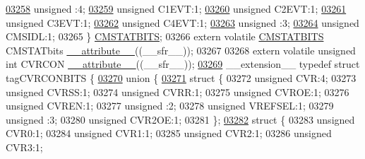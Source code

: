 \begin{DoxyCode}
\hypertarget{a00009_source_l03258}{}\hyperlink{a00008_adf71f3d8410c1f1dbbc96680a92c49af}{03258}   \textcolor{keywordtype}{unsigned} :4;
\hypertarget{a00009_source_l03259}{}\hyperlink{a00008_acb7ee136b83067f36d2dadab8625b1a7}{03259}   \textcolor{keywordtype}{unsigned} C1EVT:1;
\hypertarget{a00009_source_l03260}{}\hyperlink{a00008_aec68f11a447fc00b2a632bb8aae3899e}{03260}   \textcolor{keywordtype}{unsigned} C2EVT:1;
\hypertarget{a00009_source_l03261}{}\hyperlink{a00008_a12277a444d526f913bb692c4aff46c78}{03261}   \textcolor{keywordtype}{unsigned} C3EVT:1;
\hypertarget{a00009_source_l03262}{}\hyperlink{a00008_a8cb94c32ab97dbd81bac22bf1317e706}{03262}   \textcolor{keywordtype}{unsigned} C4EVT:1;
\hypertarget{a00009_source_l03263}{}\hyperlink{a00008_acaf2d0924a107ec6e8d2e31febaf66f9}{03263}   \textcolor{keywordtype}{unsigned} :3;
\hypertarget{a00009_source_l03264}{}\hyperlink{a00008_ade32d9beff74e352daa224124b7f49d2}{03264}   \textcolor{keywordtype}{unsigned} CMSIDL:1;
03265 \} \hyperlink{a00008_d0/d01/a00339}{CMSTATBITS};
03266 \textcolor{keyword}{extern} \textcolor{keyword}{volatile} \hyperlink{a00008_d0/d01/a00339}{CMSTATBITS} CMSTATbits \hyperlink{a00009_a493c46f03454991ccc5aa7a6e1dfb2a7}{\_\_attribute\_\_}((\_\_sfr\_\_));
03267 
03268 \textcolor{keyword}{extern} \textcolor{keyword}{volatile} \textcolor{keywordtype}{unsigned} \textcolor{keywordtype}{int}  CVRCON \hyperlink{a00009_a493c46f03454991ccc5aa7a6e1dfb2a7}{\_\_attribute\_\_}((\_\_sfr\_\_));
\hypertarget{a00009_source_l03269}{}\hyperlink{a00008}{03269} \_\_extension\_\_ \textcolor{keyword}{typedef} \textcolor{keyword}{struct }tagCVRCONBITS \{
\hypertarget{a00009_source_l03270}{}\hyperlink{a00009}{03270}   \textcolor{keyword}{union }\{
\hypertarget{a00009_source_l03271}{}\hyperlink{a00009}{03271}     \textcolor{keyword}{struct }\{
03272       \textcolor{keywordtype}{unsigned} CVR:4;
03273       \textcolor{keywordtype}{unsigned} CVRSS:1;
03274       \textcolor{keywordtype}{unsigned} CVRR:1;
03275       \textcolor{keywordtype}{unsigned} CVROE:1;
03276       \textcolor{keywordtype}{unsigned} CVREN:1;
03277       \textcolor{keywordtype}{unsigned} :2;
03278       \textcolor{keywordtype}{unsigned} VREFSEL:1;
03279       \textcolor{keywordtype}{unsigned} :3;
03280       \textcolor{keywordtype}{unsigned} CVR2OE:1;
03281     \};
\hypertarget{a00009_source_l03282}{}\hyperlink{a00009}{03282}     \textcolor{keyword}{struct }\{
03283       \textcolor{keywordtype}{unsigned} CVR0:1;
03284       \textcolor{keywordtype}{unsigned} CVR1:1;
03285       \textcolor{keywordtype}{unsigned} CVR2:1;
03286       \textcolor{keywordtype}{unsigned} CVR3:1;

\end{DoxyCode}
